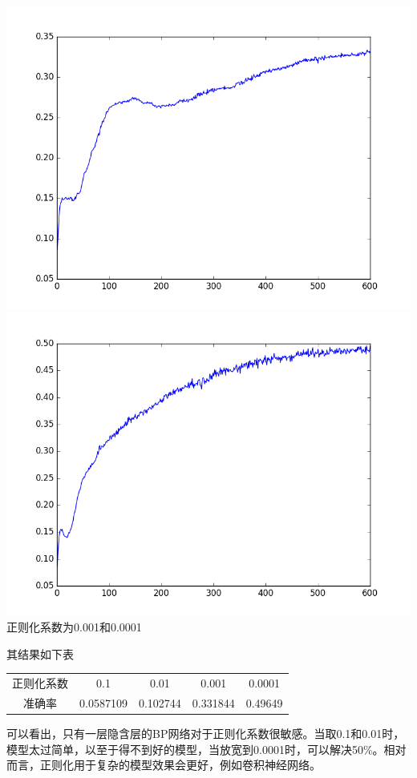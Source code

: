 \begin{center}
\includegraphics[scale=0.4]{../figures/Log/BP_new8/BP_new8_acc.png} 
\includegraphics[scale=0.4]{../figures/Log/BP_new10/BP_new10_acc.png} \\
正则化系数为0.001和0.0001
\end{center}
其结果如下表
\begin{center}
\begin{tabular}{ccccc}
\toprule[2pt]
正则化系数 & 0.1 & 0.01 & 0.001 & 0.0001 \\ 
准确率 & 0.0587109 & 0.102744 & 0.331844 & 0.49649 \\ 
\bottomrule[2pt]
\end{tabular} 
\end{center}
可以看出，只有一层隐含层的BP网络对于正则化系数很敏感。当取0.1和0.01时，模型太过简单，以至于得不到好的模型，当放宽到0.0001时，可以解决50\%。相对而言，正则化用于复杂的模型效果会更好，例如卷积神经网络。

